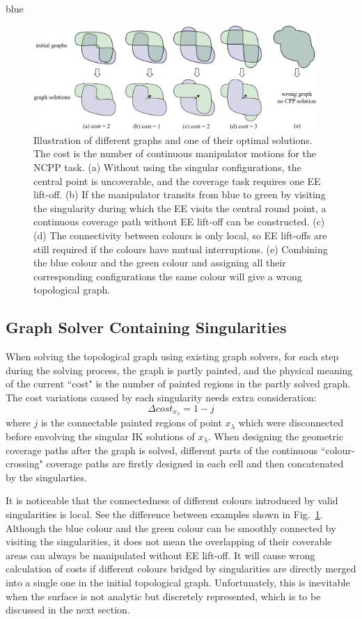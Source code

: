\documentclass[Afour,sageh,times]{sagej}
\begin{document}
\begin{color}{blue}
\begin{figure}[t]
\centering
\includegraphics[width=0.96\textwidth]{figures/other_figures/cost}
\caption{Illustration of different graphs and one of their optimal solutions. 
The cost is the number of continuous manipulator motions for the NCPP task. 
(a) Without using the singular configurations, the central point is uncoverable, and the coverage task requires one EE lift-off. 
(b) If the manipulator transits from blue to green by visiting the singularity during which the EE visits the central round point, a continuous coverage path without EE lift-off can be constructed. 
(c)(d) The connectivity between colours is only local, so EE lift-offs are still required if the colours have mutual interruptions. 
(e) Combining the blue colour and the green colour and assigning all their corresponding configurations the same colour will give a wrong topological graph. 
}\label{fig:cost}
\end{figure}

\subsection{Graph Solver Containing Singularities}
When solving the topological graph using existing graph solvers, for each step during the solving process, the graph is partly painted, and the physical meaning of the current ``cost" is the number of painted regions in the partly solved graph. 
The cost variations caused by each singularity needs extra consideration: 
\begin{equation}
\Delta cost_{x_\lambda} = 1 - j
\end{equation}
where $j$ is the connectable painted regions of point $x_\lambda$ which were disconnected before envolving the singular IK solutions of $x_\lambda$. 
When designing the geometric coverage paths after the graph is solved, different parts of the continuous ``colour-crossing" coverage paths are firstly designed in each cell and then concatenated by the singularties. 

It is noticeable that the connectedness of different colours introduced by valid singularities is local. See the difference between examples shown in Fig.~\ref{fig:cost}. 
Although the blue colour and the green colour can be smoothly connected by visiting the singularities, it does not mean the overlapping of their coverable areas can always be manipulated without EE lift-off. 
It will cause wrong calculation of costs if different colours bridged by singularities are directly merged into a single one in the initial topological graph. 
Unfortunately, this is inevitable when the surface is not analytic but discretely represented, which is to be discussed in the next section. 
\end{color}
\end{document}
